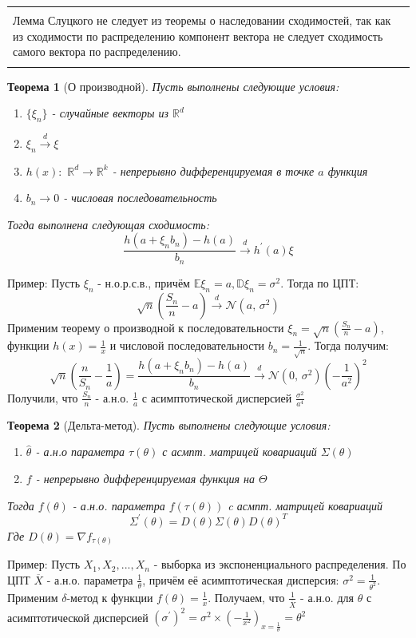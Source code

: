 \documentclass[a4paper,12pt]{article}
\newcommand{\expec}{\mathbb{E}}
\newcommand{\disp}{\mathbb{D}}
\newcommand{\normal}[2]{\mathcal{N}(#1,\,#2)}
\newcommand{\dconv}{\overset{d}{\to}}
\newcommand{\sample}{X_1, X_2, ..., X_n}
\newcommand{\R}{\mathbb{R}}
\newenvironment{annotation}{\begin{center}
    \begin{tabular}{|p{0.9\textwidth}|}
    \hline\\
}
{ 
    \\\\\hline
    \end{tabular} 
    \end{center}
}
\theoremstyle{named}
\newtheorem*{namedtheorem}{Теорема}
\begin{document}
\begin{annotation}
    Лемма Слуцкого не следует из теоремы о наследовании сходимостей, так как из сходимости по распределению 
    компонент вектора не следует сходимость самого вектора по распределению. 
\end{annotation}
\begin{namedtheorem}[О производной]
    Пусть выполнены следующие условия:
    \begin{enumerate}
        \item $\{\xi_n\}$ - случайные векторы из $\R^d$
        \item $\xi_n \dconv \xi$ 
        \item $h(x): \,\, \R^d \to \R^k$ - непрерывно дифференцируемая в точке $a$ функция 
        \item $b_n \to 0$ - числовая последовательность\\
    \end{enumerate}
    Тогда выполнена следующая сходимость:
    $$
        \frac{h(a + \xi_n b_n) - h(a)}{b_n} \dconv h^\prime(a) \xi
    $$
\end{namedtheorem}
Пример: Пусть $\xi_n$ - н.о.р.с.в., причём $\expec \xi_n = a, \disp \xi_n = \sigma^2$. Тогда по ЦПТ:
$$
    \sqrt{n}\left(\frac{S_n}{n} - a\right) \dconv \normal{a}{\sigma^2}
$$
Применим теорему о производной к последовательности $\xi_n = \sqrt{n}\left(\frac{S_n}{n} - a\right)$, функции $h(x) = \frac{1}{x}$ и числовой 
последовательности $b_n = \frac{1}{\sqrt{n}}$. Тогда получим:
$$
    \sqrt{n}\left(\frac{n}{S_n} - \frac{1}{a}\right) =\frac{h(a + \xi_n b_n) - h(a)}{b_n} \dconv \normal{0}{\sigma^2}\left(-\frac{1}{a^2}\right)^2
$$
Получили, что $\frac{S_n}{n}$ - а.н.о. $\frac{1}{a}$ с асимптотической дисперсией $\frac{\sigma^2}{a^4}$
\begin{namedtheorem}[Дельта-метод]
    Пусть выполнены следующие условия:
    \begin{enumerate}
        \item  $\hat\theta$ - а.н.о параметра $\tau(\theta)$ с асмпт. матрицей ковариаций $\Sigma(\theta)$
        \item $f$ - непрерывно дифференцируемая функция на $\Theta$
    \end{enumerate}
    Тогда $f(\theta)$ - а.н.о. параметра $f(\tau(\theta))$ c асмпт. матрицей ковариаций 
    $$
        \Sigma^\prime (\theta) = D(\theta)\Sigma(\theta)D(\theta)^T
    $$
    Где $D(\theta) = \nabla f_{\tau(\theta)}$
\end{namedtheorem}
Пример: Пусть $\sample$ - выборка из экспоненциального распределения. По ЦПТ $\overline{X}$ - а.н.о. параметра $\frac{1}{\theta}$,
причём её асимптотическая дисперсия: $\sigma^2 = \frac{1}{\theta^2}$.
Применим $\delta$-метод к функции $f(\theta) = \frac{1}{x}$. Получаем, что $\frac{1}{\overline{X}}$ - а.н.о. для $\theta$
с асимптотической дисперсией $(\sigma^\prime)^2 = \sigma^2\times(-\frac{1}{x^2})_{x=\frac{1}{\theta}} = \theta^2$
\end{document}

